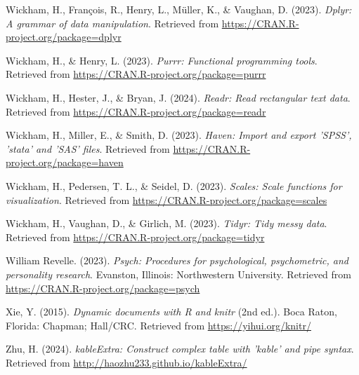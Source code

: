 \documentclass[
  man,floatsintext]{apa6}
\newlength{\cslhangindent}
\newlength{\cslentryspacingunit} %
\newenvironment{CSLReferences}[2] %
 {%
  \setlength{\parindent}{0pt}
  \ifodd #1
  \let\oldpar\par
  \def\par{\hangindent=\cslhangindent\oldpar}
  \fi
  \setlength{\parskip}{#2\cslentryspacingunit}
 }%
 {}
\begin{document}
\begin{CSLReferences}{1}{0}
\leavevmode{}%
Wickham, H., François, R., Henry, L., Müller, K., \& Vaughan, D. (2023). \emph{Dplyr: A grammar of data manipulation}. Retrieved from \url{https://CRAN.R-project.org/package=dplyr}

\leavevmode{}%
Wickham, H., \& Henry, L. (2023). \emph{Purrr: Functional programming tools}. Retrieved from \url{https://CRAN.R-project.org/package=purrr}

\leavevmode{}%
Wickham, H., Hester, J., \& Bryan, J. (2024). \emph{Readr: Read rectangular text data}. Retrieved from \url{https://CRAN.R-project.org/package=readr}

\leavevmode{}%
Wickham, H., Miller, E., \& Smith, D. (2023). \emph{Haven: Import and export 'SPSS', 'stata' and 'SAS' files}. Retrieved from \url{https://CRAN.R-project.org/package=haven}

\leavevmode{}%
Wickham, H., Pedersen, T. L., \& Seidel, D. (2023). \emph{Scales: Scale functions for visualization}. Retrieved from \url{https://CRAN.R-project.org/package=scales}

\leavevmode{}%
Wickham, H., Vaughan, D., \& Girlich, M. (2023). \emph{Tidyr: Tidy messy data}. Retrieved from \url{https://CRAN.R-project.org/package=tidyr}

\leavevmode{}%
William Revelle. (2023). \emph{Psych: Procedures for psychological, psychometric, and personality research}. Evanston, Illinois: Northwestern University. Retrieved from \url{https://CRAN.R-project.org/package=psych}

\leavevmode{}%
Xie, Y. (2015). \emph{Dynamic documents with {R} and knitr} (2nd ed.). Boca Raton, Florida: Chapman; Hall/CRC. Retrieved from \url{https://yihui.org/knitr/}

\leavevmode{}%
Zhu, H. (2024). \emph{kableExtra: Construct complex table with 'kable' and pipe syntax}. Retrieved from \url{http://haozhu233.github.io/kableExtra/}

\end{CSLReferences}
\end{document}
